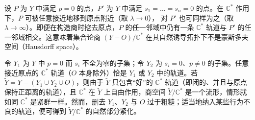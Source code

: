 

设 $P$ 为 $Y$ 中满足 $p=0$ 的点，$P'$ 为 $Y$ 中满足 $s_1=\ldots=s_n=0$ 的点。在 $\mathbb{C}^*$ 作用下，$P$ 可被任意接近地移到原点附近（取 $\lambda\to0$），
\label{op:45}
对 $P'$ 也可同样为之（取 $\lambda\to\infty$）。即便在构造商时挖去原点，$P$ 的任一邻域中仍有一条 $\mathbb{C}^*$ 轨道与 $P'$ 的任一邻域相交。这意味着集合论商 $(Y-O)/\mathbb{C}^*$ 在其自然诱导拓扑下不是豪斯多夫空间（Hausdorff space）。

令 $Y_1$ 为 $Y$ 中 $p=0$ 而 $s_i$ 不全为零的子集；令 $Y_2$ 为 $s_i=0$、$p\neq0$ 的子集。任意接近原点的 $\mathbb{C}^*$ 轨道（$O$ 本身除外）恰是 $Y_1$ 或 $Y_2$ 中的轨道。若 $\tilde{Y}=Y-(Y_1\cup Y_2\cup O)$，则由于 $\tilde{Y}$ 只包含“好”的 $\mathbb{C}^*$ 轨道（即闭的、并且与原点保持正距离的轨道），且 $\mathbb{C}^*$ 在 $\tilde{Y}$ 上自由作用，商空间 $\tilde{Y}/\mathbb{C}^*$ 是一个流形，情形就如同 $\mathbb{C}^*$ 是紧群一样。然而，删去 $Y_1$、$Y_2$ 与 $O$ 过于粗糙；适当地纳入某些行为不良的轨道，便可得到 $\tilde{Y}/\mathbb{C}^*$ 的自然部分紧化。


